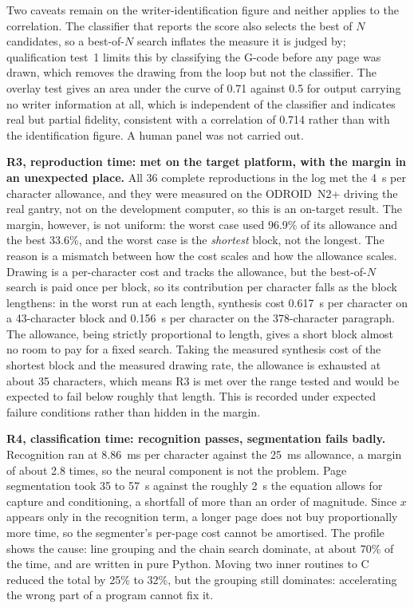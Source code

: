         Two caveats remain on the writer-identification figure and neither applies to the correlation.
        The classifier that reports the score also selects the best of $N$ candidates, so a best-of-$N$ search inflates the measure it is judged by; qualification test~1 limits this by classifying the G-code before any page was drawn, which removes the drawing from the loop but not the classifier.
        The overlay test gives an area under the curve of 0.71 against 0.5 for output carrying no writer information at all, which is independent of the classifier and indicates real but partial fidelity, consistent with a correlation of 0.714 rather than with the identification figure.
        A human panel was not carried out.

        \textbf{R3, reproduction time: met on the target platform, with the margin in an unexpected place.}
        All 36 complete reproductions in the log met the 4~s per character allowance, and they were measured on the ODROID~N2+ driving the real gantry, not on the development computer, so this is an on-target result.
        The margin, however, is not uniform: the worst case used 96.9\% of its allowance and the best 33.6\%, and the worst case is the \emph{shortest} block, not the longest.
        The reason is a mismatch between how the cost scales and how the allowance scales.
        Drawing is a per-character cost and tracks the allowance, but the best-of-$N$ search is paid once per block, so its contribution per character falls as the block lengthens: in the worst run at each length, synthesis cost 0.617~s per character on a 43-character block and 0.156~s per character on the 378-character paragraph.
        The allowance, being strictly proportional to length, gives a short block almost no room to pay for a fixed search.
        Taking the measured synthesis cost of the shortest block and the measured drawing rate, the allowance is exhausted at about 35 characters, which means R3 is met over the range tested and would be expected to fail below roughly that length.
        This is recorded under expected failure conditions rather than hidden in the margin.

        \textbf{R4, classification time: recognition passes, segmentation fails badly.}
        Recognition ran at 8.86~ms per character against the 25~ms allowance, a margin of about 2.8 times, so the neural component is not the problem.
        Page segmentation took 35 to 57~s against the roughly 2~s the equation allows for capture and conditioning, a shortfall of more than an order of magnitude.
        Since $x$ appears only in the recognition term, a longer page does not buy proportionally more time, so the segmenter's per-page cost cannot be amortised.
        The profile shows the cause: line grouping and the chain search dominate, at about 70\% of the time, and are written in pure Python.
        Moving two inner routines to C reduced the total by 25\% to 32\%, but the grouping still dominates: accelerating the wrong part of a program cannot fix it.

